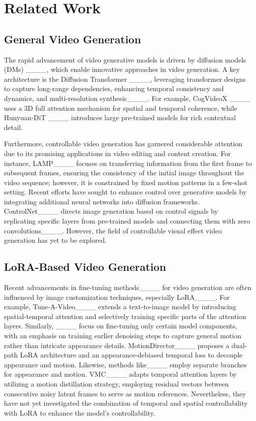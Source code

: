 \section{Related Work}
\subsection{General Video Generation}
The rapid advancement of video generative models is driven by diffusion models (DMs) ____, which enable innovative approaches in video generation.
A key architecture is the Diffusion Transformer ____, leveraging transformer designs to capture long-range dependencies, enhancing temporal consistency and dynamics, and multi-resolution synthesis____.
For example, CogVideoX ____ uses a 3D full attention mechanism for spatial and temporal coherence, while Hunyuan-DiT ____ introduces large pre-trained models for rich contextual detail. 



Furthermore, controllable video generation has garnered considerable attention due to its promising applications in video editing and content creation. 
For instance, LAMP____ focuses on transferring information from the first frame to subsequent frames, ensuring the consistency of the initial image throughout the video sequence; however, it is constrained by fixed motion patterns in a few-shot setting. 
Recent efforts have sought to enhance control over generative models by integrating additional neural networks into diffusion frameworks. 
ControlNet____ directs image generation based on control signals by replicating specific layers from pre-trained models and connecting them with zero convolutions____. However, the field of controllable visual effect video generation has yet to be explored.
\subsection{LoRA-Based Video Generation}
Recent advancements in fine-tuning methods____ for video generation are often influenced by image customization techniques, especially LoRA____. For example, Tune-A-Video____ extends a text-to-image model by introducing spatial-temporal attention and selectively training specific parts of the attention layers. Similarly, ____ focus on fine-tuning only certain model components, with an emphasis on training earlier denoising steps to capture general motion rather than intricate appearance details. MotionDirector____ proposes a dual-path LoRA architecture and an appearance-debiased temporal loss to decouple appearance and motion. Likewise, methods like____ employ separate branches for appearance and motion. VMC____ adapts temporal attention layers by utilizing a motion distillation strategy, employing residual vectors between consecutive noisy latent frames to serve as motion references. Nevertheless, they have not yet investigated the combination of temporal and spatial controllability with LoRA to enhance the model's controllability.